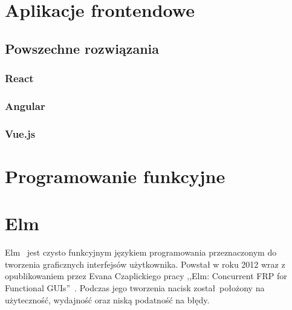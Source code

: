 \documentclass[twoside,a4paper]{report}
\begin{document}

\chapter{Aplikacje frontendowe}

\section{Powszechne rozwiązania}

\subsection{React}
\cite{react}
\cite{reactdocs}
\subsection{Angular}
\cite{angularjs}
\cite{angulardocs}
\subsection{Vue.js}
\cite{vuejsdocs}



\chapter{Programowanie funkcyjne}


\chapter{Elm}
Elm~\cite{elmdocs} jest czysto funkcyjnym językiem programowania przeznaczonym do tworzenia graficznych interfejsów użytkownika. Powstał w roku 2012 wraz z opublikowaniem przez Evana Czaplickiego pracy ,,Elm: Concurrent FRP for Functional GUIs''~\cite{Czaplicki2012ElmC}. Podczas jego tworzenia nacisk został położony na użyteczność, wydajność oraz niską podatność na błędy.
\end{document}
